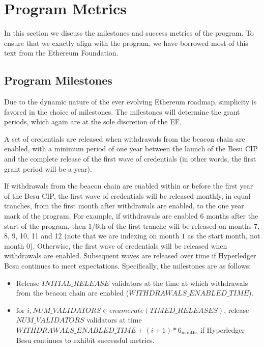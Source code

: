 
\section{Program Metrics} \label{sec:metrics}
In this section we discuss the milestones and success metrics of the program.  To ensure that we exactly align with the program, we have borrowed most of this text from the Ethereum Foundation.

\subsection{Program Milestones}
Due to the dynamic nature of the ever evolving Ethereum roadmap, simplicity is favored in the choice of milestones.  The milestones will determine the grant periods, which again are at the sole discretion of the EF.

A set of credentials are released when withdrawals from the beacon chain are enabled, with a minimum period of one year between the launch of the Besu CIP and the complete release of the first wave of credentials (in other words, the first grant period will be a year).

If withdrawals from the beacon chain are enabled within or before the first year of the Besu CIP, the first wave of credentials will be released monthly, in equal tranches, from the first month after withdrawals are enabled, to the one year mark of the program. For example, if withdrawals are enabled 6 months after the start of the program, then 1/6th of the first tranche will be released on months 7, 8, 9, 10, 11 and 12 (note that we are indexing on month $1$ as the start month, not month $0$). Otherwise, the first wave of credentials will be released when withdrawals are enabled. Subsequent waves are released over time if Hyperledger Besu continues to meet expectations. Specifically, the milestones are as follows:

\begin{itemize}
\item Release $INITIAL\_RELEASE$ validators at the time at which withdrawals from the beacon chain are enabled ($WITHDRAWALS\_ENABLED\_TIME$).
\item $\text{for } i, NUM\_VALIDATORS \in enumerate \left(TIMED\_RELEASES \right)$, release $NUM\_VALIDATORS$ validators at time $WITHDRAWALS\_ENABLED\_TIME + (i + 1) * 6_{\text{months}}$ if Hyperledger Besu continues to exhibit successful metrics.
\end{itemize}


